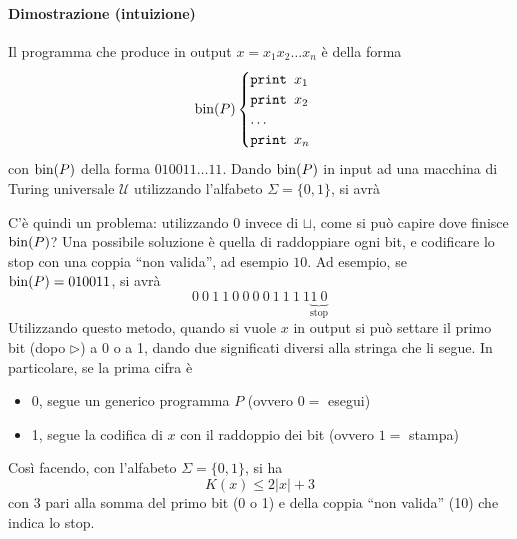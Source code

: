 \paragraph{Dimostrazione (intuizione)} Il programma che produce in output $x=x_1x_2\dots x_n$ è della forma 
\begin{align*}
    \operatorname*{bin}(P)\begin{cases}
        \texttt{print }x_1\\
        \texttt{print }x_2\\
        \dots\\
        \texttt{print }x_n
    \end{cases}
\end{align*}
con $\operatorname*{bin}(P)$ della forma $010011\dots 11$. Dando $\operatorname*{bin}(P)$ in input ad una macchina di Turing universale $\mathcal{U}$ utilizzando l'alfabeto $\Sigma=\{0,1\}$, si avrà
\begin{center}
\end{center}
C'è quindi un problema: utilizzando $0$ invece di $\sqcup$, come si può capire dove finisce $\operatorname*{bin}(P)$? Una possibile soluzione è quella di raddoppiare ogni bit, e codificare lo stop con una coppia ``non valida'', ad esempio $10$. Ad esempio, se $\operatorname*{bin}(P)=010011$, si avrà
$$
    0~0~1~1~0~0~0~0~1~1~1~1\underbrace{1~0}_{\text{stop}}
$$
Utilizzando questo metodo, quando si vuole $x$ in output si può settare il primo bit (dopo $\rhd$) a 0 o a 1, dando due significati diversi alla stringa che li segue. In particolare, se la prima cifra è 
\begin{itemize}
    \item 0, segue un generico programma $P$ (ovvero $0=$ esegui)
    \item 1, segue la codifica di $x$ con il raddoppio dei bit (ovvero $1=$ stampa)
\end{itemize}
Così facendo, con l'alfabeto $\Sigma=\{0,1\}$, si ha
$$
    K(x) \leq 2|x| + 3
$$
con 3 pari alla somma del primo bit (0 o 1) e della coppia ``non valida'' (10) che indica lo stop.

